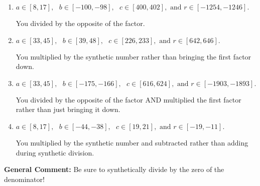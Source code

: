 \documentclass{extbook}[14pt]
\begin{document}
\begin{enumerate}
{\begin{enumerate}[label=\Alph*.]
* This is the solution!
\item \( a \in [8, 17], \text{   } b \in [-100, -98], \text{   } c \in [400, 402], \text{   and   } r \in [-1254, -1246]. \)

 You divided by the opposite of the factor.
\item \( a \in [33, 45], \text{   } b \in [39, 48], \text{   } c \in [226, 233], \text{   and   } r \in [642, 646]. \)

 You multiplied by the synthetic number rather than bringing the first factor down.
\item \( a \in [33, 45], \text{   } b \in [-175, -166], \text{   } c \in [616, 624], \text{   and   } r \in [-1903, -1893]. \)

 You divided by the opposite of the factor AND multiplied the first factor rather than just bringing it down.
\item \( a \in [8, 17], \text{   } b \in [-44, -38], \text{   } c \in [19, 21], \text{   and   } r \in [-19, -11]. \)

 You multiplied by the synthetic number and subtracted rather than adding during synthetic division.
\end{enumerate}

\textbf{General Comment:} Be sure to synthetically divide by the zero of the denominator!
}
\end{enumerate}
\end{document}
